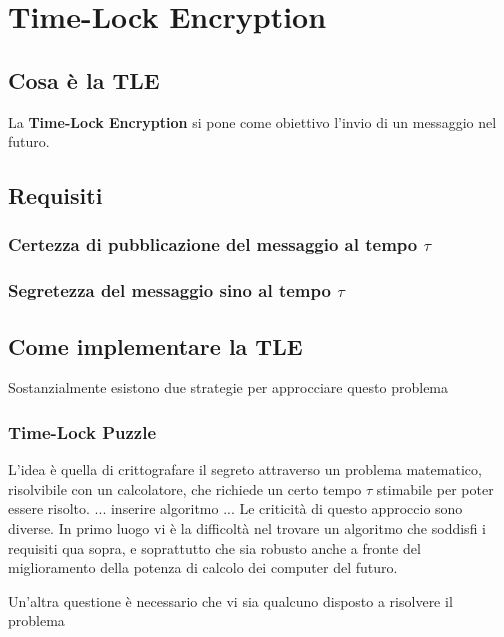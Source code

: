 \chapter{Time-Lock Encryption}

\section{Cosa è la TLE}
La \textbf{Time-Lock Encryption} si pone come obiettivo l'invio di un messaggio
nel futuro.

\section{Requisiti}

\subsection{Certezza di pubblicazione del messaggio al tempo $ \tau $}

\subsection{Segretezza del messaggio sino al tempo $ \tau $}
\label{subsec:segretezza-tle}


\section{Come implementare la TLE}
Sostanzialmente esistono due strategie per approcciare questo problema

\subsection{Time-Lock Puzzle}
L'idea è quella di crittografare il segreto attraverso un problema matematico,
risolvibile con un calcolatore, che richiede un certo tempo $ \tau $ stimabile 
per poter essere risolto. 
... inserire algoritmo ...
Le criticità di questo approccio sono diverse. In primo luogo vi è la difficoltà nel
trovare un algoritmo che soddisfi i requisiti qua sopra, e soprattutto che sia robusto
anche a fronte del miglioramento della potenza di calcolo dei computer del futuro.

Un'altra questione è necessario che vi sia qualcuno disposto a risolvere il problema 
